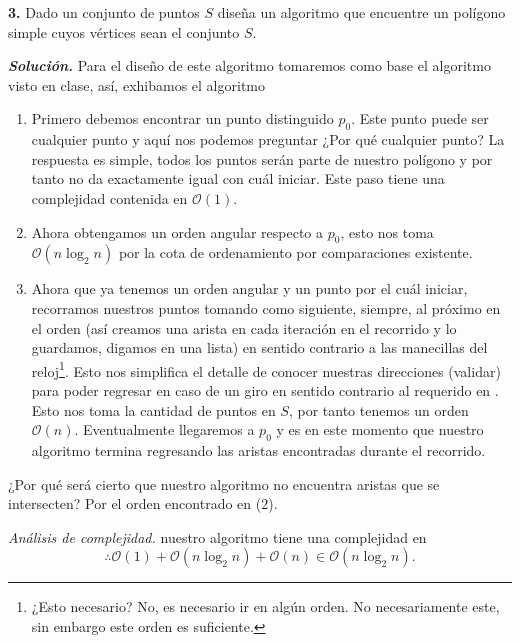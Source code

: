 \textbf{3.} Dado un conjunto de puntos $S$ diseña un algoritmo que encuentre un polígono simple
cuyos vértices sean el conjunto $S$. \newline

\textbf{\textit{Solución.}} Para el diseño de este algoritmo tomaremos como base el algoritmo 
visto en clase, así, exhibamos el algoritmo
\begin{enumerate}
\item Primero debemos encontrar un punto distinguido $p_0$. Este punto puede ser cualquier punto y aquí nos podemos preguntar
  ¿Por qué cualquier punto? La respuesta es simple, todos los puntos serán parte de nuestro polígono y por tanto no da exactamente
  igual con cuál iniciar. Este paso tiene una complejidad contenida en $\mathcal{O}(1)$.
\item Ahora obtengamos un orden angular respecto a $p_0$, esto nos toma $\mathcal{O}(n \log_{2} n)$ por la cota de ordenamiento
  por comparaciones existente.
\item Ahora que ya tenemos un orden angular y un punto por el cuál iniciar, recorramos nuestros puntos tomando como siguiente, siempre,
  al próximo en el orden (así creamos una arista en cada iteración en el recorrido y lo guardamos, digamos en una lista) en sentido
  contrario a las manecillas del reloj\footnote{¿Esto necesario? No, es necesario ir en algún orden. No necesariamente este, sin embargo
  este orden es suficiente.}. Esto nos simplifica el detalle de conocer nuestras direcciones (validar) para poder regresar en caso de un
  giro en sentido contrario al requerido en . Esto nos toma la cantidad de puntos en $S$, por tanto tenemos un orden
  $\mathcal{O}(n)$. Eventualmente llegaremos a $p_0$ y es en este momento que nuestro algoritmo termina regresando las aristas encontradas
  durante el recorrido.
\end{enumerate}

¿Por qué será cierto que nuestro algoritmo no encuentra aristas que se intersecten? Por el orden encontrado en ($2$).
\newline

\textit{Análisis de complejidad.} nuestro algoritmo tiene una complejidad en
\[\therefore \mathcal{O}(1) + \mathcal{O}(n \log_{2} n) + \mathcal{O}(n) \in \mathcal{O}(n \log_2 n).\]

